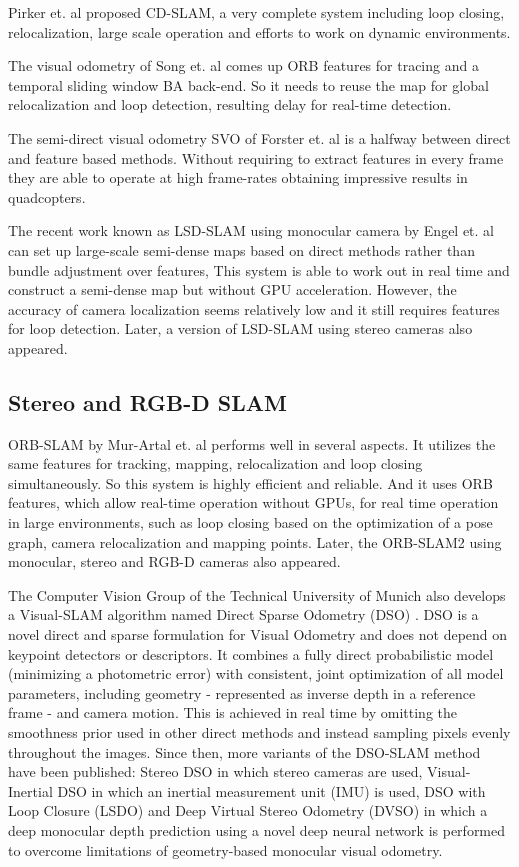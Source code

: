 \documentclass[letterpaper, 10 pt, conference]{IEEEtran}
\begin{document}
Pirker et. al \cite{c5} proposed CD-SLAM, a very complete system including loop 
closing, relocalization, large scale operation and efforts to work on dynamic
environments.

The visual odometry of Song et. al \cite{c6} comes up ORB features for tracing 
and a temporal sliding window BA back-end. So it needs to reuse the map for 
global relocalization and loop detection, resulting delay for real-time 
detection. 

The semi-direct visual odometry SVO of Forster et. al \cite{c7} is a halfway 
between direct and feature based methods. Without requiring to extract features 
in every frame they are able to operate at high frame-rates obtaining impressive
results in quadcopters.

The recent work known as LSD-SLAM using monocular camera by Engel et. al
\cite{c8} can set up large-scale semi-dense maps based on direct methods rather
than bundle adjustment over features, This system is able to work out in real 
time and construct a semi-dense map but without GPU acceleration. However, the 
accuracy of camera localization seems relatively low and it still requires 
features for loop detection. Later, a version of LSD-SLAM using stereo cameras
\cite{c9} also appeared.

\subsection{Stereo and RGB-D SLAM} \label{sect:\thesubsection}
ORB-SLAM by Mur-Artal et. al \cite{c10} performs well in several aspects. It 
utilizes the same features for tracking, mapping, relocalization and loop 
closing simultaneously. So this system is highly efficient and reliable. And it
uses ORB features, which allow real-time operation without GPUs, for real time 
operation in large environments, such as loop closing based on the optimization
of a pose graph, camera relocalization and mapping points. Later, the ORB-SLAM2
using monocular, stereo and RGB-D cameras \cite{c1} also appeared.

The Computer Vision Group of the Technical University of Munich also develops a
Visual-SLAM algorithm named Direct Sparse Odometry (DSO) \cite{c11}. DSO is a
novel direct and sparse formulation for Visual Odometry and does not depend on
keypoint detectors or descriptors. It combines a fully direct probabilistic
model (minimizing a photometric error) with consistent, joint optimization of
all model parameters, including geometry - represented as inverse depth in a
reference frame - and camera motion. This is achieved in real time by omitting
the smoothness prior used in other direct methods and instead sampling pixels
evenly throughout the images. Since then, more variants of the DSO-SLAM method
have been published: Stereo DSO \cite{c12} in which stereo cameras are used,
Visual-Inertial DSO \cite{c13} in which an inertial measurement unit (IMU) is
used, DSO with Loop Closure (LSDO) \cite{c14} and Deep Virtual Stereo Odometry
(DVSO) \cite{c15} in which a deep monocular depth prediction using a novel deep
neural network is performed to overcome limitations of geometry-based monocular
visual odometry.
\end{document}
